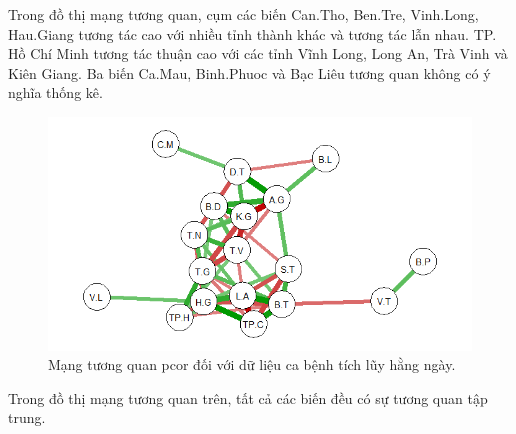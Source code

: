 \documentclass[../thesis.tex]{subfiles}
\begin{document}
Trong đồ thị mạng tương quan, cụm các biến Can.Tho, Ben.Tre, Vinh.Long, Hau.Giang tương tác cao với nhiều tỉnh thành khác và tương tác lẫn nhau. TP. Hồ Chí Minh tương tác thuận cao với các tỉnh Vĩnh Long, Long An, Trà Vinh và Kiên Giang. Ba biến Ca.Mau, Binh.Phuoc và Bạc Liêu tương quan không có ý nghĩa thống kê. 









\begin{Shaded}
	\begin{Highlighting}[]
\OtherTok{\textless{}{-}}\SpecialCharTok{\%\textgreater{}\%} \NormalTok{() }\SpecialCharTok{\%\textgreater{}\%} 
\SpecialCharTok{::}
		 \NormalTok{, }
		 \NormalTok{, }
		 \NormalTok{,}
		 
		 \NormalTok{)}
	\end{Highlighting}
\end{Shaded}

\begin{figure}[H]
	\centering
	\includegraphics[width=0.7\linewidth]{images/net_cul_05}
	\caption[Mạng tương quan pcor đối với dữ liệu ca bệnh tích lũy hằng ngày]{Mạng tương quan pcor đối với dữ liệu ca bệnh tích lũy hằng ngày.}
	\label{fig:netcul05}
\end{figure}

Trong đồ thị mạng tương quan trên, tất cả các biến đều có sự tương quan tập trung. 
\end{document}
